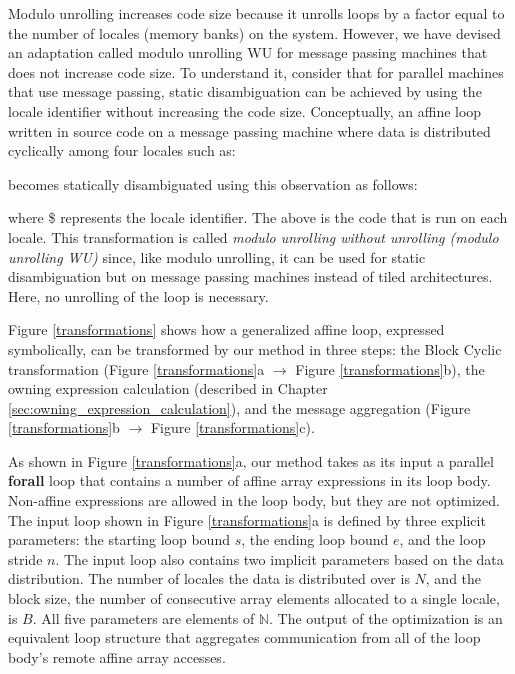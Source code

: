 Modulo unrolling increases code size because it unrolls loops by a factor equal to the number of locales (memory banks) on the system. However, we have devised an adaptation called modulo unrolling WU for message passing machines that does not increase code size. To understand it, consider that for parallel machines that use message passing, static disambiguation can be achieved by using the locale identifier without increasing the code size. Conceptually, an affine loop written in source code on a message passing machine where data is distributed cyclically among four locales such as:\newline



\tab{\texttt{\}}}\newline

becomes statically disambiguated using this observation as follows:\newline



\tab{\texttt{\}}}\newline

where \$ represents the locale identifier. The above is the code that is run on each locale. This transformation is called \textit{modulo unrolling without unrolling (modulo unrolling WU)} since, like modulo unrolling, it can be used for static disambiguation but on message passing machines instead of tiled architectures. Here, no unrolling of the loop is necessary.

Figure \ref{transformations} shows how a generalized affine loop, expressed symbolically, can be transformed by our method in three steps: the Block Cyclic transformation (Figure \ref{transformations}a $\rightarrow$ Figure \ref{transformations}b), the owning expression calculation (described in Chapter \ref{sec:owning_expression_calculation}), and the message aggregation (Figure \ref{transformations}b $\rightarrow$ Figure \ref{transformations}c). 

As shown in Figure \ref{transformations}a, our method takes as its input a parallel \textbf{forall} loop that contains a number of affine array expressions in its loop body. Non-affine expressions are allowed in the loop body, but they are not optimized. The input loop shown in Figure \ref{transformations}a is defined by three explicit parameters: the starting loop bound $s$, the ending loop bound $e$, and the loop stride $n$. The input loop also contains two implicit parameters based on the data distribution. The number of locales the data is distributed over is $N$, and the block size, the number of consecutive array elements allocated to a single locale, is $B$. All five parameters are elements of $\mathbb{N}$. The output of the optimization is an equivalent loop structure that aggregates communication from all of the loop body's remote affine array accesses.

